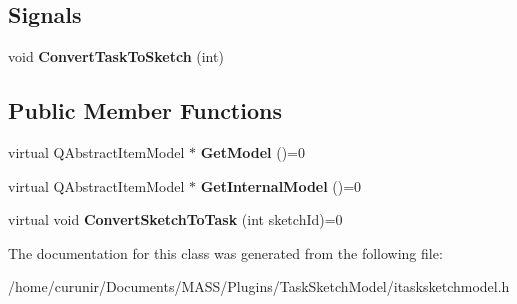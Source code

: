 \subsection*{Signals}
\begin{DoxyCompactItemize}
\item 
void {\bfseries Convert\+Task\+To\+Sketch} (int)\hypertarget{class_i_task_sketch_model_a0bd379546cbb601a0ba0027ba41c22eb}{}\label{class_i_task_sketch_model_a0bd379546cbb601a0ba0027ba41c22eb}

\end{DoxyCompactItemize}
\subsection*{Public Member Functions}
\begin{DoxyCompactItemize}
\item 
virtual Q\+Abstract\+Item\+Model $\ast$ {\bfseries Get\+Model} ()=0\hypertarget{class_i_task_sketch_model_afd9ecfd849e9a10cae71d9d87ae34e5b}{}\label{class_i_task_sketch_model_afd9ecfd849e9a10cae71d9d87ae34e5b}

\item 
virtual Q\+Abstract\+Item\+Model $\ast$ {\bfseries Get\+Internal\+Model} ()=0\hypertarget{class_i_task_sketch_model_a321be8117a6275d0716c07241d7e402a}{}\label{class_i_task_sketch_model_a321be8117a6275d0716c07241d7e402a}

\item 
virtual void {\bfseries Convert\+Sketch\+To\+Task} (int sketch\+Id)=0\hypertarget{class_i_task_sketch_model_aef1346d2236510066f9dc8b0c1f68916}{}\label{class_i_task_sketch_model_aef1346d2236510066f9dc8b0c1f68916}

\end{DoxyCompactItemize}


The documentation for this class was generated from the following file\+:\begin{DoxyCompactItemize}
\item 
/home/curunir/\+Documents/\+M\+A\+S\+S/\+Plugins/\+Task\+Sketch\+Model/itasksketchmodel.\+h\end{DoxyCompactItemize}
